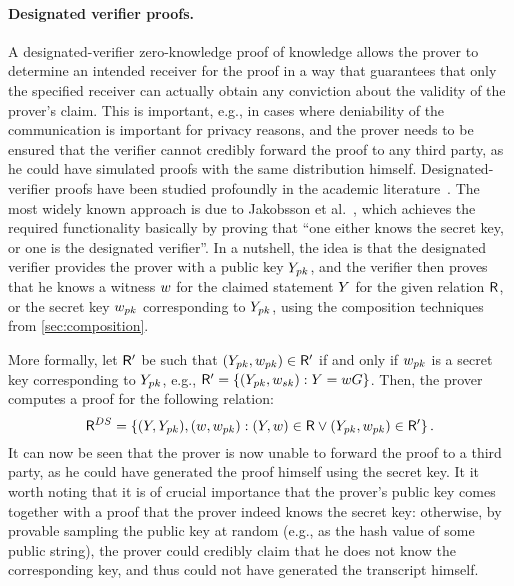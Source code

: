 \documentclass[runningheads]{llncs}
\begin{document}
\paragraph{Designated verifier proofs.} 
A designated-verifier zero-knowledge proof of knowledge allows the prover to determine an intended receiver for the proof in a way that guarantees that only the specified receiver can actually obtain any conviction about the validity of the prover's claim.
This is important, e.g., in cases where deniability of the communication is important for privacy reasons, and the prover needs to be ensured that the verifier cannot credibly forward the proof to any third party, as he could have simulated proofs with the same distribution himself.
Designated-verifier proofs have been studied profoundly in the academic literature~\cite{EC:JakSakImp96,EC:ChaCou18}.
The most widely known approach is due to Jakobsson et al.~\cite{EC:JakSakImp96}, which achieves the required functionality basically by proving that ``one either knows the secret key, or one is the designated verifier''. 
In a nutshell, the idea is that the designated verifier provides the prover with a public key $Y_{pk}$, and the verifier then proves that he knows a witness $w$ for the claimed statement $Y$ for the given relation $\mathsf{R}$, or the secret key $w_{pk}$ corresponding to $Y_{pk}$, using the composition techniques from \cref{sec:composition}.

More formally, let $\mathsf{R}'$ be such that $(Y_{pk},w_{pk})\in\mathsf{R}'$ if and only if $w_{pk}$ is a secret key corresponding to $Y_{pk}$, e.g., $\mathsf{R}'=\{(Y_{pk},w_{sk}):Y=w G\}$.
Then, the prover computes a proof for the following relation:
$$
  \mathsf{R}^{DS} = \{(Y,Y_{pk}),(w,w_{pk}) : (Y,w)\in\mathsf{R}\lor (Y_{pk},w_{pk})\in\mathsf{R}'\}\,.
$$
It can now be seen that the prover is now unable to forward the proof to a third party, as he could have generated the proof himself using the secret key.
It it worth noting that it is of crucial importance that the prover's public key comes together with a proof that the prover indeed knows the secret key:
otherwise, by provable sampling the public key at random (e.g., as the hash value of some public string), the prover could credibly claim that he does not know the corresponding key, and thus could not have generated the transcript himself.
\end{document}
